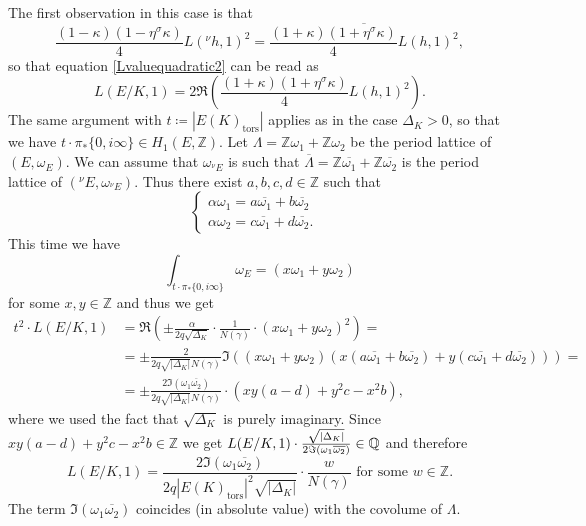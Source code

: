 \documentclass[11pt]{amsart}
\theoremstyle{definition}
\begin{document}
		The first observation in this case is that
		$$\frac{(1-\kappa)(1-\eta{{}^\sigma\!}\kappa)}{4}L({{}^\nu\!} h,1)^2=\overline{\frac{(1+\kappa)(1+\eta{{}^\sigma\!}\kappa)}{4}L(h,1)^2},$$
		so that equation \eqref{Lvaluequadratic2} can be read as
				$$L(E/K,1)=2\Re\left(\frac{(1+\kappa)(1+\eta{{}^\sigma\!}\kappa)}{4}L(h,1)^2\right).$$
		The same argument with $t\coloneqq |E(K)_{\text{tors}}|$ applies as in the case $\Delta_K>0$, so that we have $t\cdot\pi_*\{0,i\infty\}\in H_1(E,{\mathbb{Z}})$. Let $\Lambda={\mathbb{Z}}\omega_1+{\mathbb{Z}}\omega_2$ be the period lattice of $(E,\omega_E)$. We can assume that $\omega_{{{}^\nu\!} E}$ is such that $\overline{\Lambda}={\mathbb{Z}}\overline{\omega_1}+{\mathbb{Z}}\overline{\omega_2}$ is the period lattice of $({{}^\nu\!} E,\omega_{{{}^\nu\!} E})$. Thus there exist $a,b,c,d\in {\mathbb{Z}}$ such that
		$$\begin{cases}
			 \alpha\omega_1=a\overline{\omega_1}+b\overline{\omega_2} & \\
			\alpha\omega_2=c\overline{\omega_1}+d\overline{\omega_2}. 
		\end{cases}$$
		This time we have
		$$\int_{t\cdot \pi_*\{0,i\infty\}}\omega_E=(x\omega_1+y\omega_2)$$
		for some $x,y\in {\mathbb{Z}}$ and thus we get
			\begin{equation*}\begin{split}
				t^2\cdot L(E/K,1)& =\Re\left(\pm\frac{\alpha}{2q\sqrt{\Delta_K}}\cdot\frac{1}{N(\gamma)}\cdot(x\omega_1+y\omega_2)^2\right)=\\
				& =\pm\frac{2}{2q\sqrt{|\Delta_K|}N(\gamma)}\Im((x\omega_1+y\omega_2)(x(a\overline{\omega_1}+b\overline{\omega_2})+y(c\overline{\omega_1}+d\overline{\omega_2})))=\\
				& =\pm \frac{2\Im(\omega_1\overline{\omega_2})}{2q\sqrt{|\Delta_K|}N(\gamma)}\cdot (xy(a-d)+y^2c-x^2b),
			\end{split}
		\end{equation*}
		where we used the fact that $\sqrt{\Delta_K}$ is purely imaginary. Since $xy(a-d)+y^2c-x^2b\in {\mathbb{Z}}$ we get ${\displaystyle} L(E/K,1)\cdot\frac{\sqrt{|\Delta_K|}}{2\Im(\omega_1\overline{\omega_2})}\in {\mathbb{Q}}$ and therefore
			\begin{equation}\label{imgquadbound}
				L(E/K,1)=\frac{2\Im(\omega_1\overline{\omega_2})}{2q|E(K)_{\text{tors}}|^2\sqrt{|\Delta_K|}}\cdot \frac{w}{N(\gamma)}\mbox{ for some } w\in {\mathbb{Z}}.
		\end{equation}
		The term $\Im(\omega_1\overline{\omega_2})$ coincides (in absolute value) with the covolume of $\Lambda$.
\end{document}

